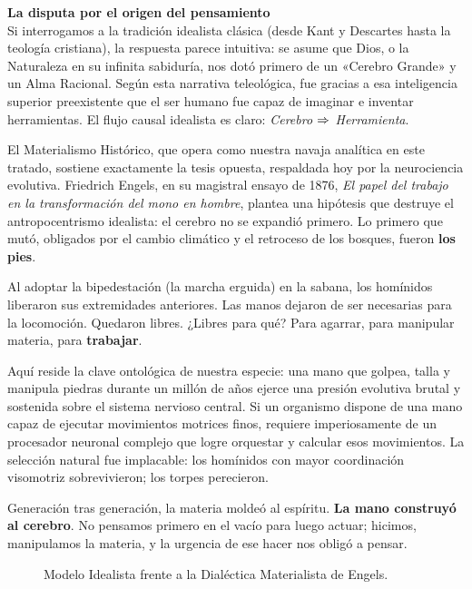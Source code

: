 \begin{argumento}
\textbf{La disputa por el origen del pensamiento}\\
Si interrogamos a la tradición idealista clásica (desde Kant y Descartes hasta la teología cristiana), la respuesta parece intuitiva: se asume que Dios, o la Naturaleza en su infinita sabiduría, nos dotó primero de un «Cerebro Grande» y un Alma Racional. Según esta narrativa teleológica, fue gracias a esa inteligencia superior preexistente que el ser humano fue capaz de imaginar e inventar herramientas. El flujo causal idealista es claro: \textit{Cerebro $\Rightarrow$ Herramienta}.

El Materialismo Histórico, que opera como nuestra navaja analítica en este tratado, sostiene exactamente la tesis opuesta, respaldada hoy por la neurociencia evolutiva. Friedrich Engels, en su magistral ensayo de 1876, \textit{El papel del trabajo en la transformación del mono en hombre}, plantea una hipótesis que destruye el antropocentrismo idealista: el cerebro no se expandió primero. Lo primero que mutó, obligados por el cambio climático y el retroceso de los bosques, fueron \textbf{los pies}.
\end{argumento}

Al adoptar la bipedestación (la marcha erguida) en la sabana, los homínidos liberaron sus extremidades anteriores. Las manos dejaron de ser necesarias para la locomoción. Quedaron libres. ¿Libres para qué? Para agarrar, para manipular materia, para \textbf{trabajar}.

Aquí reside la clave ontológica de nuestra especie: una mano que golpea, talla y manipula piedras durante un millón de años ejerce una presión evolutiva brutal y sostenida sobre el sistema nervioso central. Si un organismo dispone de una mano capaz de ejecutar movimientos motrices finos, requiere imperiosamente de un procesador neuronal complejo que logre orquestar y calcular esos movimientos. La selección natural fue implacable: los homínidos con mayor coordinación visomotriz sobrevivieron; los torpes perecieron. 

Generación tras generación, la materia moldeó al espíritu. \textbf{La mano construyó al cerebro}. No pensamos primero en el vacío para luego actuar; hicimos, manipulamos la materia, y la urgencia de ese hacer nos obligó a pensar. 

\begin{figure}[htbp]
    \centering
    
    \caption{Modelo Idealista frente a la Dialéctica Materialista de Engels.}
    \label{fig:dialectica_mano}
\end{figure}

